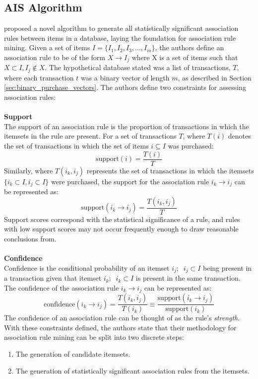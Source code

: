 \subsection{AIS Algorithm}
\label{sec:ais}
 proposed a novel algorithm to generate all statistically significant association rules between items in a database, laying the foundation for association rule mining. Given a set of items $I = \{I_1, I_2, I_3,\dots,I_m\}$, the authors define an association rule to be of the form $X \rightarrow I_j$ where X is a set of items such that $X \subset I, I_j \notin X$.  The hypothetical database stated was a list of transactions, $T$, where each transaction $t$ was a binary vector of length $m$, as described in Section \ref{sec:binary_purchase_vectors}. The authors define two constraints for assessing association rules:
\\\\\textbf{Support}\\
The support of an association rule is the proportion of transactions in which the itemsets in the rule are present. For a set of transactions $T$, where $T(i)$ denotes the set of transactions in which the set of items $i \subseteq I$ was purchased:
\[
\text{support}(i) = \frac{T(i)}{T} 
\]
Similarly, where $T{(i_k, i_j)}$ represents the set of transactions in which the itemsets $\{i_k \subset I, i_j\subset I\}$ were purchased, the support for the association rule $i_k \rightarrow i_j$ can be represented as:
\[
\text{support}(i_k \rightarrow i_j) = \frac{T(i_k, i_j)}{T} 
\]
Support scores correspond with the statistical significance of a rule, and rules with low support scores may not occur frequently enough to draw reasonable conclusions from.
\\\\\textbf{Confidence}\\
Confidence is the conditional probability of an itemset $i_j;\;\;i_j \subset I$ being present in a transaction given that itemset $i_k;\;\;i_k \subset I$ is present in the same transaction. The confidence of the association rule $i_k \rightarrow i_j$ can be represented as:
\[
\text{confidence}(i_k \rightarrow i_j) = \frac{T(i_k, i_j)}{T(i_k)} \equiv \frac{\text{support}(i_k \rightarrow i_j)}{\text{support}(i_k)}
\]
The confidence of an association rule can be thought of as the rule's \textit{strength}.
\\With these constraints defined, the authors state that their methodology for association rule mining can be split into two discrete steps:
\begin{enumerate}
\item The generation of candidate itemsets.
\item The generation of statistically significant association rules from the itemsets.
\end{enumerate}
